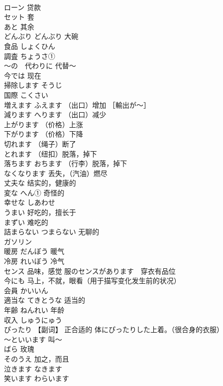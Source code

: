 \documentclass[8pt]{extreport}
\begin{document}
\begin{CJK}{UTF8}{min}
\\	ローン	贷款	
\\	セット	套	
\\	あと	其余	
\\	どんぶり	どんぶり 大碗	
\\	食品	しょくひん	
\\	調査	ちょうさ①	
\\	～の　代わりに	代替～	
\\	今では	现在	
\\	掃除します	そうじ	
\\	国際	こくさい	
\\	増えます	ふえます （出口）增加 ［輸出が〜］	
\\	減ります	へります （出口）减少	
\\	上がります	（价格）上涨	
\\	下がります	（价格）下降	
\\	切れます	（绳子）断了	
\\	とれます	（纽扣）脱落，掉下	
\\	落ちます	おちます （行李）脱落，掉下	
\\	なくなります	丢失，（汽油）燃尽	
\\	丈夫な	结实的，健康的	
\\	変な	へん① 奇怪的	
\\	幸せな	しあわせ	
\\	うまい	好吃的，擅长于	
\\	まずい	难吃的	
\\	詰まらない	つまらない 无聊的	
\\	ガソリン	
\\	暖房	だんぼう 暖气	
\\	冷房	れいぼう 冷气	
\\	センス	品味，感觉 服のセンスがあります　穿衣有品位	
\\	今にも	马上，不就，眼看（用于描写变化发生前的状况）	
\\	会員	かいいん	
\\	適当な	てきとうな 适当的	
\\	年齢	ねんれい 年龄	
\\	収入	しゅうにゅう	
\\	ぴったり	【副词】 正合适的 体にぴったりした上着。（很合身的衣服）	
\\	〜といいます	叫～	
\\	ばら	玫瑰	
\\	そのうえ	加之，而且	
\\	泣きます	なきます	
\\	笑います	わらいます	

\end{CJK}
\end{document}
